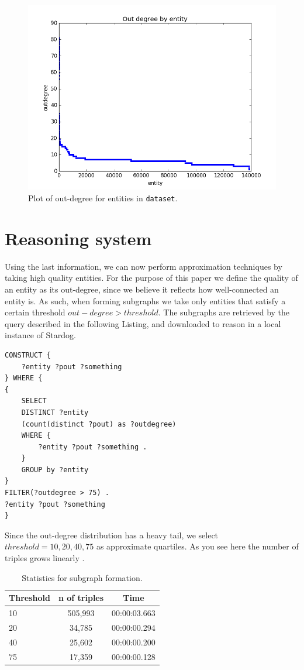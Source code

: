 \documentclass[runningheads,a4paper]{../../StyleFiles/llncs}
\begin{document}
\begin{figure}[h]
	\centering
	\includegraphics[width=.7\textwidth]{img/dataset_outdegree.png}
	\caption{Plot of out-degree for entities in \texttt{dataset}.}
	\label{fig:outdegree}
\end{figure}

\section{Reasoning system}
Using the last information, we can now perform approximation techniques by taking high quality entities. For the purpose of this paper we define the quality of an entity as its out-degree, since we believe it reflects how well-connected an entity is. As such, when forming subgraphs we take only entities that satisfy a certain threshold $ out-degree > threshold$. The subgraphs are retrieved by the query described in the following Listing, and downloaded to reason in a local instance of Stardog.

\begin{lstlisting}[captionpos=b, caption=SPARQL query for calculating out degree of entities, label=lst:sparql, basicstyle=\ttfamily\small,frame=bt]
CONSTRUCT {
	?entity ?pout ?something
} WHERE { 
{
	SELECT
	DISTINCT ?entity
	(count(distinct ?pout) as ?outdegree)
	WHERE {
		?entity ?pout ?something .
	}
	GROUP by ?entity
}
FILTER(?outdegree > 75) .
?entity ?pout ?something
}
\end{lstlisting}

Since the out-degree distribution has a heavy tail, we select $threshold = 10, 20, 40, 75$ as approximate quartiles. As you see here the number of triples grows linearly .

\begin{table}[h]
	\begin{center}
		\begin{tabular}{| l | c | c |}
			\hline
			\textbf{Threshold} & \textbf{n of triples} & \textbf{Time} \\ \hline
			10 &  505,993 & 00:00:03.663 \\ \hline
			20 & 34,785 & 00:00:00.294 \\ \hline
			40 & 25,602 & 00:00:00.200 \\ \hline
			75 & 17,359 & 00:00:00.128 \\ \hline
		\end{tabular}
		\caption{Statistics for subgraph formation.}
		\label{frequency_table}
	\end{center}
\end{table}
\end{document}
